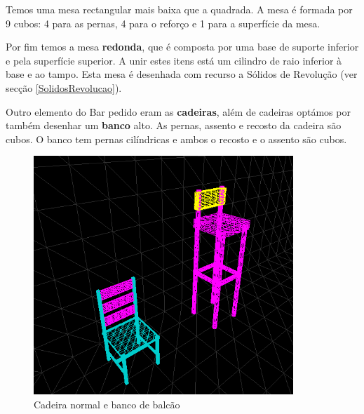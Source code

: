 \documentclass[a5paper,onecolumn, 11pt]{article}
\begin{document}
\begin{description}
Temos uma mesa rectangular mais baixa que a quadrada. A mesa é formada por 9 cubos: 4 para as pernas, 4 para o reforço e 1 para a superfície da mesa.

Por fim temos a mesa \textbf{redonda}, que é composta por uma base de suporte inferior e pela superfície superior. A unir estes itens está um cilindro de raio inferior à base e ao tampo. Esta mesa é desenhada com recurso a Sólidos de Revolução (ver secção \ref{SolidosRevolucao}).

Outro elemento do Bar pedido eram as \textbf{cadeiras}, além de cadeiras optámos por também desenhar um \textbf{banco} alto. As pernas, assento e recosto da cadeira são cubos. O banco tem pernas cilíndricas e ambos o recosto e o assento são cubos.
\begin{figure}[h!b!t!]
    \centering
    \includegraphics[width=370px, height=340px]{cadeiras.png}
    \caption{Cadeira normal e banco de balcão}
\end{figure}


\end{description}
\end{document}
